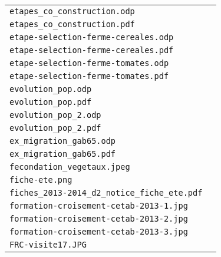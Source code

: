 \begin{center}
\begin{supertabular}{p{.8\textwidth}c}
\texttt{etapes\_co\_construction.odp} & \cite{etapes_co_construction} \\
\texttt{etapes\_co\_construction.pdf} & \\ \hline

\texttt{etape-selection-ferme-cereales.odp} & \cite{etape-selection-ferme-cereales} \\
\texttt{etape-selection-ferme-cereales.pdf} & \\ \hline

\texttt{etape-selection-ferme-tomates.odp} & \cite{etape-selection-ferme-tomates} \\
\texttt{etape-selection-ferme-tomates.pdf} & \\ \hline

\texttt{evolution\_pop.odp} & \cite{evolution_pop} \\
\texttt{evolution\_pop.pdf} & \\ \hline

\texttt{evolution\_pop\_2.odp} & \cite{evolution_pop_2} \\
\texttt{evolution\_pop\_2.pdf} & \\ \hline

\texttt{ex\_migration\_gab65.odp} & \cite{ex_migration_gab65} \\
\texttt{ex\_migration\_gab65.pdf} & \\ \hline

\texttt{fecondation\_vegetaux.jpeg} & \cite{fecondation_vegetaux} \\ \hline

\texttt{fiche-ete.png} & \cite{fiche-ete} \\ \hline

\texttt{fiches\_2013-2014\_d2\_notice\_fiche\_ete.pdf} & \cite{fiches_2013-2014_d2_notice_fiche_ete} \\ \hline

\texttt{formation-croisement-cetab-2013-1.jpg} & \cite{formation-croisement-cetab-2013-1} \\ \hline

\texttt{formation-croisement-cetab-2013-2.jpg} & \cite{formation-croisement-cetab-2013-2} \\ \hline

\texttt{formation-croisement-cetab-2013-3.jpg} & \cite{formation-croisement-cetab-2013-3} \\ \hline

\texttt{FRC-visite17.JPG} & \cite{FRC-visite17} \\ \hline


\end{supertabular}
\end{center}
